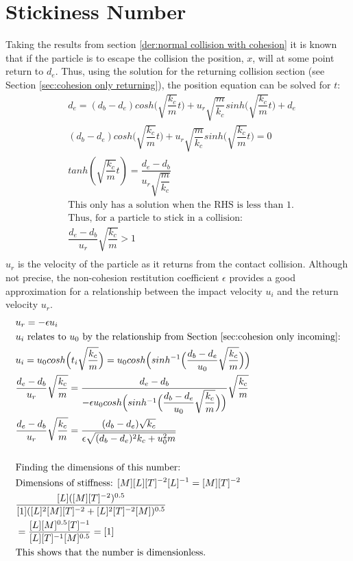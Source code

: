 \documentclass[a4paper,11pt,titlepage]{report}
\begin{document}
\section{Stickiness Number}
\label{der:stickiness number}
Taking the results from section \ref{der:normal collision with cohesion} it is known that if the particle is to escape the collision the position, $x$, will at some point return to $d_e$. Thus, using the solution for the returning collision section (see Section \ref{sec:cohesion only returning}), the position equation can be solved for $t$:
\begin{align*}
&d_e = (d_b - d_e)cosh\Big(\sqrt{\dfrac{k_c}{m}} t\Big) + u_r \sqrt{\dfrac{m}{k_c}} sinh\Big(\sqrt{\dfrac{k_c}{m}}t\Big) + d_e \\
&(d_b - d_e)cosh\Big(\sqrt{\dfrac{k_c}{m}} t\Big) + u_r \sqrt{\dfrac{m}{k_c}} sinh\Big(\sqrt{\dfrac{k_c}{m}}t\Big) = 0 \\
&tanh(\sqrt{\dfrac{k_c}{m}} t) = \dfrac{d_e - d_b}{u_r \sqrt{\dfrac{m}{k_c}}} \\
&\text{This only has a solution when the RHS is less than 1.} \\
&\text{Thus, for a particle to stick in a collision:} \\
&\dfrac{d_e - d_b}{u_r}\sqrt{\dfrac{k_c}{m}} > 1 \\
\end{align*}
$u_r$ is the velocity of the particle as it returns from the contact collision. Although not precise, the non-cohesion restitution coefficient $\epsilon$ provides a good approximation for a relationship between the impact velocity $u_i$ and the return velocity $u_r$.
\begin{align*}
&u_r = -\epsilon u_i \\
&\text{$u_i$ relates to $u_0$ by the relationship from Section \ref{sec:cohesion only incoming}:} \\
&u_i = u_0 cosh\Big(t_i \sqrt{\dfrac{k_c}{m}}\Big) = u_0 cosh\Big(sinh^{-1}\Big(\dfrac{d_b - d_e}{u_0}\sqrt{\dfrac{k_c}{m}}\Big)\Big) \\
&\dfrac{d_e - d_b}{u_r}\sqrt{\dfrac{k_c}{m}} = \dfrac{d_e - d_b}{-\epsilon u_0 cosh\Big(sinh^{-1}\Big(\dfrac{d_b - d_e}{u_0}\sqrt{\dfrac{k_c}{m}}\Big)\Big)}\sqrt{\dfrac{k_c}{m}} \\
&\dfrac{d_e - d_b}{u_r}\sqrt{\dfrac{k_c}{m}} = \dfrac{(d_b - d_e)\sqrt{k_c}}{\epsilon \sqrt{(d_b - d_e)^2 k_c + u_0 ^ 2 m}} \\\\
&\text{Finding the dimensions of this number:} \\
&\text{Dimensions of stiffness: } [M][L][T]^{-2}[L]^{-1} = [M][T]^{-2} \\
&\dfrac{[L]([M][T]^{-2})^{0.5}}{[1]([L]^2[M][T]^{-2} + [L]^2[T]^{-2}[M])^{0.5}} \\
& = \dfrac{[L][M]^{0.5}[T]^{-1}}{[L][T]^{-1}[M]^{0.5}} = [1] \\
&\text{This shows that the number is dimensionless.}
\end{align*}
\end{document}
